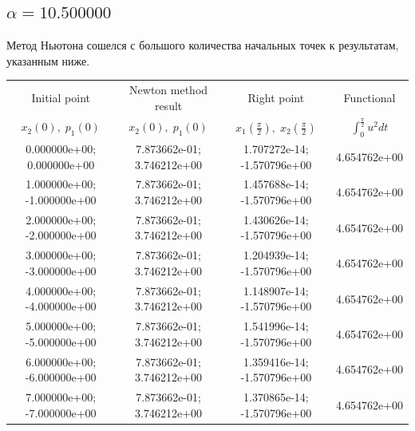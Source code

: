\documentclass[titlepage]{article}
\def\l{\left}
\def\r{\right}
\begin{document}
\subsection{$\alpha = 10.500000$} 
Метод Ньютона сошелся с большого количества начальных точек к результатам, указанным ниже. \\ 
\begin{tabular}{ | c | c | c | c |} 
\hline 
Initial point  & Newton method result & Right point & Functional 
 \\ $x_2(0), \; p_1(0)$ & $x_2(0), \; p_1(0)$ & $x_1\l(\frac{\pi}{2}\r), \; x_2\l(\frac{\pi}{2}\r)$ & $\int_{0}^{\frac{\pi}{2}}u^2dt$  \\ \hline 
0.000000e+00; 0.000000e+00 & 7.873662e-01; 3.746212e+00 & 1.707272e-14; -1.570796e+00 & 4.654762e+00 \\ \hline 
1.000000e+00; -1.000000e+00 & 7.873662e-01; 3.746212e+00 & 1.457688e-14; -1.570796e+00 & 4.654762e+00 \\ \hline 
2.000000e+00; -2.000000e+00 & 7.873662e-01; 3.746212e+00 & 1.430626e-14; -1.570796e+00 & 4.654762e+00 \\ \hline 
3.000000e+00; -3.000000e+00 & 7.873662e-01; 3.746212e+00 & 1.204939e-14; -1.570796e+00 & 4.654762e+00 \\ \hline 
4.000000e+00; -4.000000e+00 & 7.873662e-01; 3.746212e+00 & 1.148907e-14; -1.570796e+00 & 4.654762e+00 \\ \hline 
5.000000e+00; -5.000000e+00 & 7.873662e-01; 3.746212e+00 & 1.541996e-14; -1.570796e+00 & 4.654762e+00 \\ \hline 
6.000000e+00; -6.000000e+00 & 7.873662e-01; 3.746212e+00 & 1.359416e-14; -1.570796e+00 & 4.654762e+00 \\ \hline 
7.000000e+00; -7.000000e+00 & 7.873662e-01; 3.746212e+00 & 1.370865e-14; -1.570796e+00 & 4.654762e+00 \\ \hline 
\end{tabular} 
\end{document}
